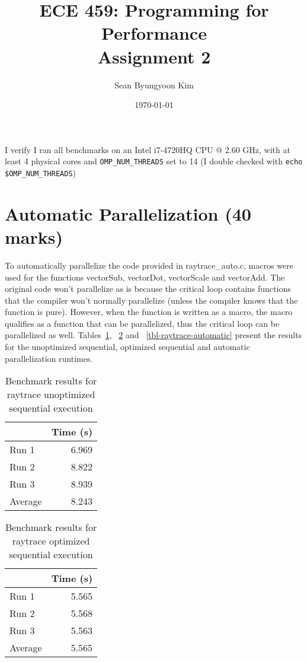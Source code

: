 \documentclass[12pt]{article}
\title{ECE 459: Programming for Performance\\Assignment 2}
\author{Sean Byungyoon Kim}
\date{\today}
\begin{document}
\maketitle

{I verify I ran all benchmarks on an Intel i7-4720HQ CPU @ 2.60 GHz, with at least 4 physical cores and
{\tt OMP\_NUM\_THREADS} set to 14 (I double checked with
{\tt echo \$OMP\_NUM\_THREADS})}

\section*{Automatic Parallelization (40 marks)}

To automatically parallelize the code provided in raytrace\_auto.c, macros were used for the functions vectorSub, vectorDot, vectorScale and vectorAdd. The original code won't parallelize as is because the critical loop contains functions that the compiler won't normally parallelize (unless the compiler knows that the function is pure). However, when the function is written as a macro, the macro qualifies as a function that can be parallelized, thus the critical loop can be parallelized as well. Tables~\ref{tbl-raytrace-unopt-sequential}, ~\ref{tbl-raytrace-opt-sequential} and ~\ref{tbl-raytrace-automatic} present the results for the unoptimized sequential, optimized sequential and automatic parallelization runtimes. 

\begin{table}[H]
  \centering
  \begin{tabular}{lr}
    & {\bf Time (s)} \\
    \hline
    Run 1 & 6.969 \\
    Run 2 & 8.822 \\
    Run 3 & 8.939 \\
    \hline
    Average & 8.243 \\
  \end{tabular}
  \caption{Benchmark results for raytrace unoptimized sequential execution}
  \label{tbl-raytrace-unopt-sequential}
\end{table}

\begin{table}[H]
  \centering
  \begin{tabular}{lr}
    & {\bf Time (s)} \\
    \hline
    Run 1 & 5.565 \\
    Run 2 & 5.568 \\
    Run 3 & 5.563 \\
    \hline
    Average & 5.565 \\
  \end{tabular}
  \caption{Benchmark results for raytrace optimized sequential execution}
  \label{tbl-raytrace-opt-sequential}
\end{table}
\end{document}
